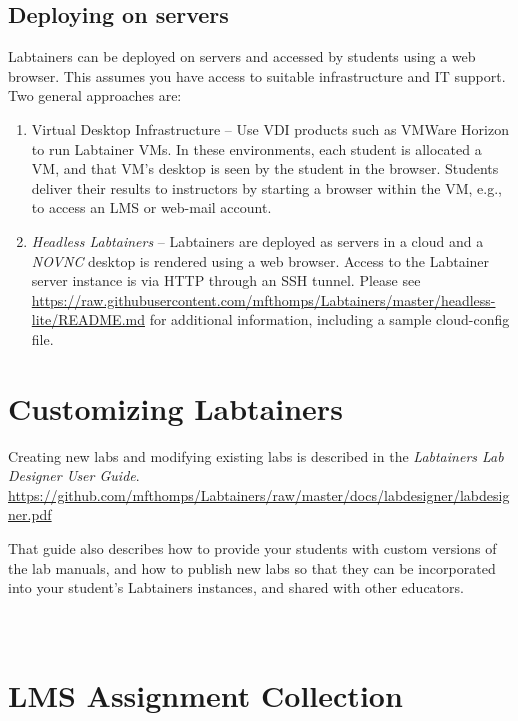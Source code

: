 \documentclass[12pt]{article}
\begin{document}
\subsection{Deploying on servers}
\label{servers}
Labtainers can be deployed on servers and accessed by students using a web browser.  This assumes you have
access to suitable infrastructure and IT support.  Two general approaches are:
\begin{enumerate}
\item Virtual Desktop Infrastructure -- Use VDI products such as VMWare Horizon 
to run Labtainer VMs. In these environments, each student is allocated a VM, and that VM's desktop is seen 
by the student in the browser.  Students deliver their results to instructors by starting a browser
within the VM, e.g., to access an LMS or web-mail account.
\item \textit{Headless Labtainers} -- Labtainers are deployed as servers in a cloud and a \textit{NOVNC} desktop is 
rendered using a web browser.  Access to the Labtainer server instance is via HTTP through an SSH tunnel.
Please see \url{https://raw.githubusercontent.com/mfthomps/Labtainers/master/headless-lite/README.md} for additional information,
including a sample cloud-config file.
\end{enumerate}

\section{Customizing Labtainers}
Creating new labs and modifying existing labs is described in the \textit{Labtainers Lab Designer User Guide}.
\url{https://github.com/mfthomps/Labtainers/raw/master/docs/labdesigner/labdesigner.pdf}

That guide also describes how to provide your students with custom versions of the lab manuals, and how to
publish new labs so that they can be incorporated into your student's Labtainers instances, and shared
with other educators.

\newpage
\appendix
\section{\\LMS Assignment Collection}
\label{lms collection}
\end{document}

